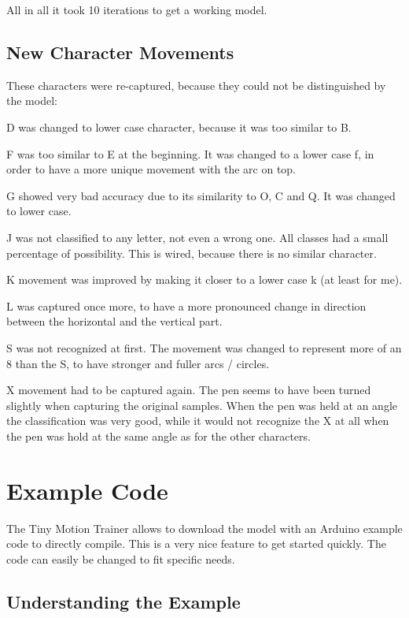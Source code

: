 \documentclass[a4paper,titlepage]{article}
\begin{document}
All in all it took 10 iterations to get a working model.

\newpage
\subsection{New Character Movements}

These characters were re-captured, because they could not be distinguished by the model:

D was changed to lower case character, because it was too similar to B.

F was too similar to E at the beginning.
It was changed to a lower case f, in order to have a more unique movement with the arc on top.

G showed very bad accuracy due to its similarity to O, C and Q.
It was changed to lower case.

J was not classified to any letter, not even a wrong one.
All classes had a small percentage of possibility.
This is wired, because there is no similar character.

K movement was improved by making it closer to a lower case k (at least for me).

L was captured once more, to have a more pronounced change in direction between the horizontal and the vertical part.

S was not recognized at first.
The movement was changed to represent more of an 8 than the S, to have stronger and fuller arcs / circles.

X movement had to be captured again.
The pen seems to have been turned slightly when capturing the original samples.
When the pen was held at an angle the classification was very good, while it would not recognize the X at all when the pen was hold at the same angle as for the other characters.

\newpage
\section{Example Code}

The Tiny Motion Trainer allows to download the model with an Arduino example code to directly compile.
This is a very nice feature to get started quickly.
The code can easily be changed to fit specific needs.

\subsection{Understanding the Example}
\end{document}
